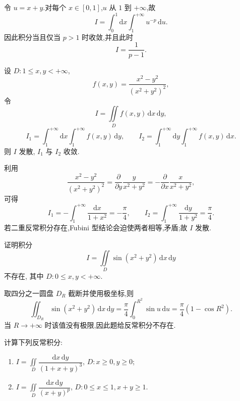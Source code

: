 \begin{solution}
    令 $u=x+y$.对每个 $x\in[0,1]$,$u$ 从 $1$ 到 $+\infty$,故
    \[
        I=\int_0^1\!\mathrm{d}x\int_1^{+\infty}u^{-p}\,\mathrm{d}u.
    \]
    因此积分当且仅当 $p>1$ 时收敛,并且此时
    \[
        I=\dfrac{1}{p-1}.
    \]
\end{solution}

\begin{example}
    设 $D:1\leq x,y<+\infty$,
    \[
        f(x,y)=\dfrac{x^2-y^2}{(x^2+y^2)^2},
    \]
    令
    \[
        I=\iint\limits_Df(x,y)\,\mathrm{d}x\,\mathrm{d}y,
    \]
    \[
        I_1=\int_1^{+\infty}\mathrm{d}x\int_1^{+\infty}f(x,y)\,\mathrm{d}y,
        \qquad
        I_2=\int_1^{+\infty}\mathrm{d}y\int_1^{+\infty}f(x,y)\,\mathrm{d}x.
    \]
    则 $I$ 发散, $I_1$ 与 $I_2$ 收敛.
\end{example}
\exampleblank

\begin{solution}
    利用
    \[
        \dfrac{x^2-y^2}{(x^2+y^2)^2}
        =\dfrac{\partial}{\partial y}\dfrac{y}{x^2+y^2}
        =-\dfrac{\partial}{\partial x}\dfrac{x}{x^2+y^2},
    \]
    可得
    \[
        I_1=-\int_1^{+\infty}\dfrac{\mathrm{d}x}{1+x^2}=-\dfrac{\pi}{4},
        \qquad
        I_2=\int_1^{+\infty}\dfrac{\mathrm{d}y}{1+y^2}=\dfrac{\pi}{4}.
    \]
    若二重反常积分存在,Fubini 型结论会迫使两者相等,矛盾;故 $I$ 发散.
\end{solution}

\begin{example}
    证明积分
    \[
        I=\iint\limits_D\sin(x^2+y^2)\,\mathrm{d}x\,\mathrm{d}y
    \]
    不存在, 其中 $D:0\leq x,y<+\infty$.
\end{example}
\exampleblank

\begin{solution}
    取四分之一圆盘 $D_R$ 截断并使用极坐标,则
    \[
        \displaystyle\iint_{D_R}\sin(x^2+y^2)\,\mathrm{d}x\,\mathrm{d}y
        =\dfrac{\pi}{4}\int_0^{R^2}\sin u\,\mathrm{d}u
        =\dfrac{\pi}{4}(1-\cos R^2).
    \]
    当 $R\to+\infty$ 时该值没有极限,因此题给反常积分不存在.
\end{solution}

\begin{example}
    计算下列反常积分:
    \begin{enumerate}
        \item $\displaystyle I=\iint\limits_D\dfrac{\mathrm{d}x\,\mathrm{d}y}{(1+x+y)^3}$, $D:x\geq0,y\geq0$;
        \item $\displaystyle I=\iint\limits_D\dfrac{\mathrm{d}x\,\mathrm{d}y}{(x+y)^p}$, $D:0\leq x\leq1,x+y\geq1$.
    \end{enumerate}
\end{example}
\exampleblank

